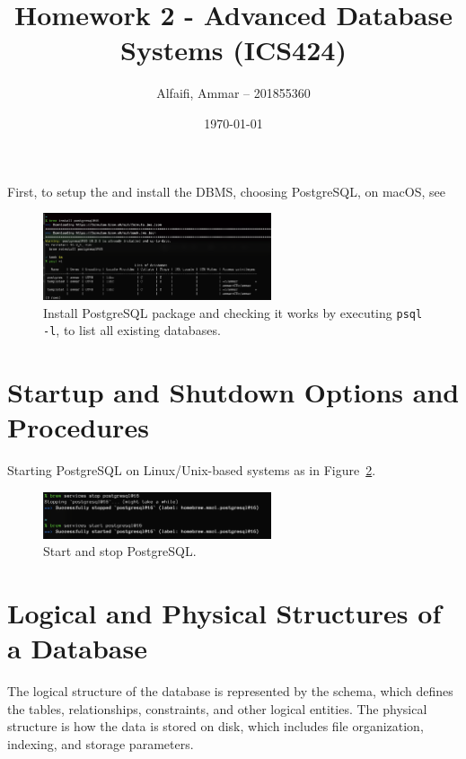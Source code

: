 \documentclass{article}
\title{Homework 2 - Advanced Database Systems (ICS424)}
\author{Alfaifi, Ammar -- 201855360}
\date{\today}
\def\c#1{\texttt{#1}}
\begin{document}
\maketitle

First, to setup the and install the DBMS, choosing PostgreSQL, on macOS, see
\begin{figure}[!h]
	\centering
	\includegraphics[width=0.6\textwidth]{figures/install_and_list.png}
	\caption{Install PostgreSQL package and checking it works by executing \c{psql -l}, to list all existing databases.}
	\label{fig:install_and_list}
\end{figure}

\section{Startup and Shutdown Options and Procedures} %
\label{sec:Startup and Shutdown Options and Procedures}
Starting PostgreSQL on Linux/Unix-based systems as in Figure~\ref{fig:Start and stop pgl}.
\begin{figure}[!hb]
	\centering
	\includegraphics[width=0.6\textwidth]{figures/stop_start_db.png}
	\caption{Start and stop PostgreSQL.}
	\label{fig:Start and stop pgl}
\end{figure}


\section{Logical and Physical Structures of a Database} %
\label{sec:Logical and Physical Structures of a Database}
The logical structure of the database is represented by the schema, which defines the tables, relationships, constraints, and other logical entities. The physical structure is how the data is stored on disk, which includes file organization, indexing, and storage parameters.
\end{document}
